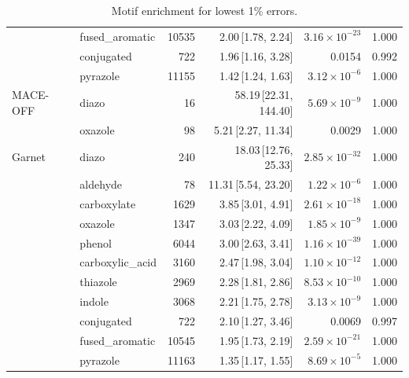 \begin{table}[t]
\begin{tabular}{llrrrr}
      & fused\_aromatic & 10535 & 2.00\,[1.78, 2.24] & $3.16\times 10^{-23}$ & 1.000 \\
      & conjugated & 722 & 1.96\,[1.16, 3.28] & 0.0154 & 0.992 \\
      & pyrazole & 11155 & 1.42\,[1.24, 1.63] & $3.12\times 10^{-6}$ & 1.000 \\
    \hline
    MACE-OFF & diazo & 16 & 58.19\,[22.31, 144.40] & $5.69\times 10^{-9}$ & 1.000 \\
      & oxazole & 98 & 5.21\,[2.27, 11.34] & 0.0029 & 1.000 \\
    \hline
    Garnet & diazo & 240 & 18.03\,[12.76, 25.33] & $2.85\times 10^{-32}$ & 1.000 \\
      & aldehyde & 78 & 11.31\,[5.54, 23.20] & $1.22\times 10^{-6}$ & 1.000 \\
      & carboxylate & 1629 & 3.85\,[3.01, 4.91] & $2.61\times 10^{-18}$ & 1.000 \\
      & oxazole & 1347 & 3.03\,[2.22, 4.09] & $1.85\times 10^{-9}$ & 1.000 \\
      & phenol & 6044 & 3.00\,[2.63, 3.41] & $1.16\times 10^{-39}$ & 1.000 \\
      & carboxylic\_acid & 3160 & 2.47\,[1.98, 3.04] & $1.10\times 10^{-12}$ & 1.000 \\
      & thiazole & 2969 & 2.28\,[1.81, 2.86] & $8.53\times 10^{-10}$ & 1.000 \\
      & indole & 3068 & 2.21\,[1.75, 2.78] & $3.13\times 10^{-9}$ & 1.000 \\
      & conjugated & 722 & 2.10\,[1.27, 3.46] & 0.0069 & 0.997 \\
      & fused\_aromatic & 10545 & 1.95\,[1.73, 2.19] & $2.59\times 10^{-21}$ & 1.000 \\
      & pyrazole & 11163 & 1.35\,[1.17, 1.55] & $8.69\times 10^{-5}$ & 1.000 \\
    \hline
  \end{tabular}
  \caption{Motif enrichment for lowest 1\% errors.}
  \label{tab:split_propers_best}
\end{table}
